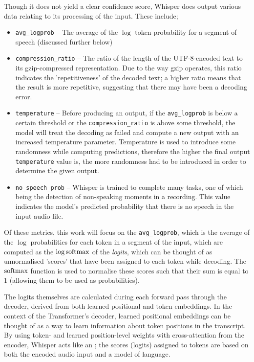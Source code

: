 Though it does not yield a clear confidence score, Whisper does output various data relating to its processing of the input.
These include;

\begin{itemize}
  \item \texttt{avg\_logprob} -- The average of the $\log$ token-probability for a segment of speech (discussed further below)
  \item \texttt{compression\_ratio} -- The ratio of the length of the UTF-8-encoded text to its gzip-compressed representation.
    Due to the way gzip operates, this ratio indicates the 'repetitiveness' of the decoded text; a higher ratio means that the result is more repetitive, suggesting that there may have been a decoding error.
  \item \texttt{temperature} -- Before producing an output, if the \texttt{avg\_logprob} is below a certain threshold or the \texttt{compression\_ratio} is above some threshold, the model will treat the decoding as failed and compute a new output with an increased temperature parameter.
    Temperature is used to introduce some randomness while computing predictions, therefore the higher the final output \texttt{temperature} value is, the more randomness had to be introduced in order to determine the given output.
  \item \texttt{no\_speech\_prob} -- Whisper is trained to complete many tasks, one of which being the detection of non-speaking moments in a recording.
    This value indicates the model's predicted probability that there is no speech in the input audio file.
\end{itemize}

Of these metrics, this work will focus on the \texttt{avg\_logprob}, which is the average of the $\log$ probabilities for each token in a segment of the input, which are computed as the $\log \operatorname{softmax}$ of the \emph{logits}, which can be thought of as unnormalised 'scores' that have been assigned to each token while decoding.
The $\operatorname{softmax}$ function is used to normalise these scores such that their sum is equal to $1$ (allowing them to be used as probabilities).

The logits themselves are calculated during each forward pass through the decoder, derived from both learned positional and token embeddings.
In the context of the Transformer's decoder, learned positional embeddings can be thought of as a way to learn information about token positions in the transcript\cite{wang2020position}.
By using token- and learned position-level weights with cross-attention from the encoder\cite{vaswani2017attention}, Whisper acts like an \cite{whisper}; the scores (logits) assigned to tokens are based on both the encoded audio input and a model of language.

